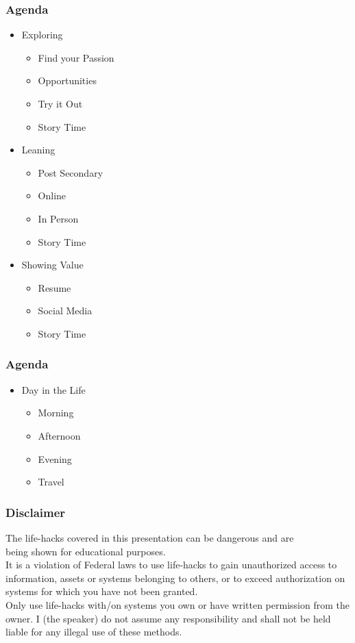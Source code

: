 \documentclass[aspectratio=169]{beamer}
\begin{document}
\begin{frame}
  \frametitle{Agenda}
  \begin{itemize}
    \item{Exploring}
      \begin{itemize}
        \item{Find your Passion}
        \item{Opportunities}
        \item{Try it Out}
        \item{Story Time}
      \end{itemize}
    \item{Leaning}
      \begin{itemize}
      \item{Post Secondary}
      \item{Online}
      \item{In Person}
      \item{Story Time}
      \end{itemize}
    \item{Showing Value}
      \begin{itemize}
        \item{Resume}
        \item{Social Media}
        \item{Story Time}
      \end{itemize}
  \end{itemize}
\end{frame}

\begin{frame}
  \frametitle{Agenda}
  \begin{itemize}
  \item{Day in the Life}
    \begin{itemize}
    \item{Morning}
    \item{Afternoon}
    \item{Evening}
    \item{Travel}
    \end{itemize}
  \end{itemize}
\end{frame}

\begin{frame}
  \frametitle{Disclaimer}
  \begin{tcolorbox}[title=disclaimer.log,colback=gray]
    The life-hacks covered in this presentation can be dangerous and are\\
    being shown for educational purposes.\\
    \newline
    It is a violation of Federal laws to use life-hacks to gain unauthorized access to information, assets or systems belonging to others, or to exceed authorization on systems for which you have not been granted.\\
    \newline
    Only use life-hacks with/on systems you own or have written permission from the owner. I (the speaker) do not assume any responsibility and shall not be held liable for any illegal use of these methods.\\
  \end{tcolorbox}
\end{frame}
\end{document}
